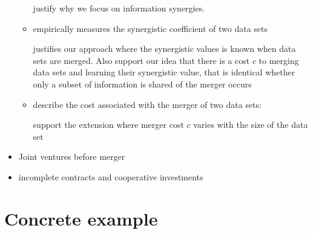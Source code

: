 \documentclass[a4paper,leqno]{article}%
\begin{document}
\begin{itemize}
\begin{itemize}
    justify why we focus on information synergies.
    \item \cite{sootla2017analyzing} empirically measures the synergistic coefficient of two data sets
    
    justifies our approach where the synergistic values is known when data sets are merged. Also support our idea that there is a cost $c$ to merging data sets and learning their synergistic value, that is identical whether only a subset of information is shared of the merger occurs
    \item \cite{hernandez1995merge} describe the cost associated with the merger of two data sets: 
    
    support the extension where merger cost $c$ varies with the size of the data set
\end{itemize}
    
    \item Joint ventures before merger
    \item incomplete contracts and cooperative investments \citep{Che1999}
\end{itemize}



\section{Concrete example}
\end{document}
